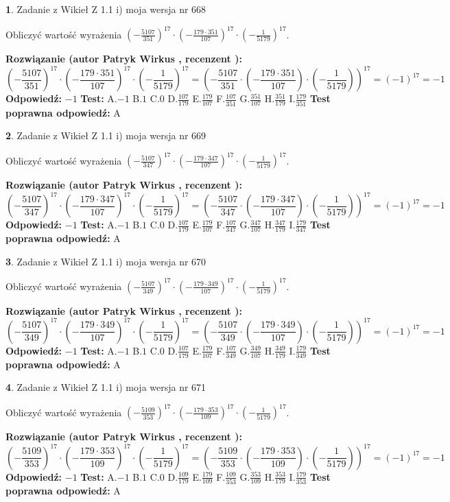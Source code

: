 \documentclass[12pt, a4paper]{article}
\theoremstyle{definition} %
\newtheorem{zad}{}
\newcommand{\zadStart}[1]{\begin{zad}#1\newline}
\newcommand{\zadStop}{\end{zad}}
\newcommand{\rozwStart}[2]{\noindent \textbf{Rozwiązanie (autor #1 , recenzent #2): }\newline}
\newcommand{\rozwStop}{\newline}
\newcommand{\odpStart}{\noindent \textbf{Odpowiedź:}\newline}
\newcommand{\odpStop}{\newline}
\newcommand{\testStart}{\noindent \textbf{Test:}\newline}
\newcommand{\testStop}{\newline}
\newcommand{\kluczStart}{\noindent \textbf{Test poprawna odpowiedź:}\newline}
\newcommand{\kluczStop}{\newline}
\begin{document}
\zadStart{Zadanie z Wikieł Z 1.1 i) moja wersja nr 668}

Obliczyć wartość wyrażenia $(-\frac{5107}{351})^{17} \cdot (-\frac{179 \cdot 351}{107})^{17} \cdot (-\frac{1}{5179})^{17}$.
\zadStop
\rozwStart{Patryk Wirkus}{}
$$(-\frac{5107}{351})^{17} \cdot (-\frac{179 \cdot 351}{107})^{17} \cdot (-\frac{1}{5179})^{17} = (-\frac{5107}{351} \cdot (-\frac{179 \cdot 351}{107}) \cdot (-\frac{1}{5179}))^{17} = (-1)^{17} = -1$$
\rozwStop
\odpStart
$-1$
\odpStop
\testStart
A.$-1$ B.$1$ C.$0$ D.$\frac{107}{179}$ E.$\frac{179}{107}$
F.$\frac{107}{351}$ G.$\frac{351}{107}$
H.$\frac{351}{179}$
I.$\frac{179}{351}$
\testStop
\kluczStart
A
\kluczStop



\zadStart{Zadanie z Wikieł Z 1.1 i) moja wersja nr 669}

Obliczyć wartość wyrażenia $(-\frac{5107}{347})^{17} \cdot (-\frac{179 \cdot 347}{107})^{17} \cdot (-\frac{1}{5179})^{17}$.
\zadStop
\rozwStart{Patryk Wirkus}{}
$$(-\frac{5107}{347})^{17} \cdot (-\frac{179 \cdot 347}{107})^{17} \cdot (-\frac{1}{5179})^{17} = (-\frac{5107}{347} \cdot (-\frac{179 \cdot 347}{107}) \cdot (-\frac{1}{5179}))^{17} = (-1)^{17} = -1$$
\rozwStop
\odpStart
$-1$
\odpStop
\testStart
A.$-1$ B.$1$ C.$0$ D.$\frac{107}{179}$ E.$\frac{179}{107}$
F.$\frac{107}{347}$ G.$\frac{347}{107}$
H.$\frac{347}{179}$
I.$\frac{179}{347}$
\testStop
\kluczStart
A
\kluczStop



\zadStart{Zadanie z Wikieł Z 1.1 i) moja wersja nr 670}

Obliczyć wartość wyrażenia $(-\frac{5107}{349})^{17} \cdot (-\frac{179 \cdot 349}{107})^{17} \cdot (-\frac{1}{5179})^{17}$.
\zadStop
\rozwStart{Patryk Wirkus}{}
$$(-\frac{5107}{349})^{17} \cdot (-\frac{179 \cdot 349}{107})^{17} \cdot (-\frac{1}{5179})^{17} = (-\frac{5107}{349} \cdot (-\frac{179 \cdot 349}{107}) \cdot (-\frac{1}{5179}))^{17} = (-1)^{17} = -1$$
\rozwStop
\odpStart
$-1$
\odpStop
\testStart
A.$-1$ B.$1$ C.$0$ D.$\frac{107}{179}$ E.$\frac{179}{107}$
F.$\frac{107}{349}$ G.$\frac{349}{107}$
H.$\frac{349}{179}$
I.$\frac{179}{349}$
\testStop
\kluczStart
A
\kluczStop



\zadStart{Zadanie z Wikieł Z 1.1 i) moja wersja nr 671}

Obliczyć wartość wyrażenia $(-\frac{5109}{353})^{17} \cdot (-\frac{179 \cdot 353}{109})^{17} \cdot (-\frac{1}{5179})^{17}$.
\zadStop
\rozwStart{Patryk Wirkus}{}
$$(-\frac{5109}{353})^{17} \cdot (-\frac{179 \cdot 353}{109})^{17} \cdot (-\frac{1}{5179})^{17} = (-\frac{5109}{353} \cdot (-\frac{179 \cdot 353}{109}) \cdot (-\frac{1}{5179}))^{17} = (-1)^{17} = -1$$
\rozwStop
\odpStart
$-1$
\odpStop
\testStart
A.$-1$ B.$1$ C.$0$ D.$\frac{109}{179}$ E.$\frac{179}{109}$
F.$\frac{109}{353}$ G.$\frac{353}{109}$
H.$\frac{353}{179}$
I.$\frac{179}{353}$
\testStop
\kluczStart
A
\kluczStop
\end{document}
